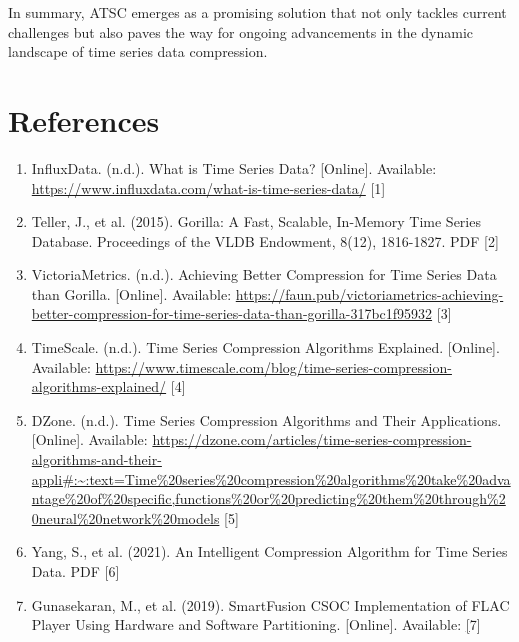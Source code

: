 \documentclass[conference]{IEEEtran}
\begin{document}
In summary, ATSC emerges as a promising solution that not only tackles current challenges but also paves the way for ongoing advancements in the dynamic landscape of time series data compression.

\section{References}

\begin{enumerate}
    \item InfluxData. (n.d.). What is Time Series Data? [Online]. Available: \url{https://www.influxdata.com/what-is-time-series-data/} [1]

    \item Teller, J., et al. (2015). Gorilla: A Fast, Scalable, In-Memory Time Series Database. Proceedings of the VLDB Endowment, 8(12), 1816-1827. PDF [2]

    \item VictoriaMetrics. (n.d.). Achieving Better Compression for Time Series Data than Gorilla. [Online]. Available: \href{https://faun.pub/victoriametrics-achieving-better-compression-for-time-series-data-than-gorilla-317bc1f95932}{https://faun.pub/victoriametrics-achieving-better-compression-for-time-series-data-than-gorilla-317bc1f95932} [3]

    \item TimeScale. (n.d.). Time Series Compression Algorithms Explained. [Online]. Available: \url{https://www.timescale.com/blog/time-series-compression-algorithms-explained/} [4]

    \item DZone. (n.d.). Time Series Compression Algorithms and Their Applications. [Online]. Available: \url{https://dzone.com/articles/time-series-compression-algorithms-and-their-appli#:~:text=Time%20series%20compression%20algorithms%20take%20advantage%20of%20specific,functions%20or%20predicting%20them%20through%20neural%20network%20models} [5]

    \item Yang, S., et al. (2021). An Intelligent Compression Algorithm for Time Series Data. PDF [6]

    \item Gunasekaran, M., et al. (2019). SmartFusion CSOC Implementation of FLAC Player Using Hardware and Software Partitioning. [Online]. Available: \href{https://www.microsemi.com/document-portal/doc_view/129825-ac376-smartfusion-csoc-implementation-of-flac-player-using-hardware-and-software-partitioning-app-note} [7]


\end{enumerate}
\end{document}
